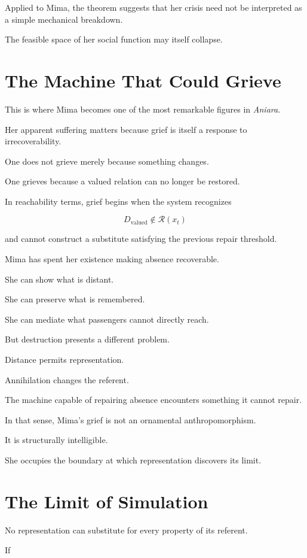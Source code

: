 \documentclass[11pt,oneside]{book}
\theoremstyle{definition}
\theoremstyle{remark}
\newcommand{\R}{\mathcal{R}}
\begin{document}
Applied to Mima, the theorem suggests that her crisis need not be interpreted as a simple mechanical breakdown.

The feasible space of her social function may itself collapse.

\section{The Machine That Could Grieve}

This is where Mima becomes one of the most remarkable figures in \emph{Aniara}.

Her apparent suffering matters because grief is itself a response to irrecoverability.

One does not grieve merely because something changes.

One grieves because a valued relation can no longer be restored.

In reachability terms, grief begins when the system recognizes

\[
D_{\mathrm{valued}}
\notin
\R(x_t)
\]

and cannot construct a substitute satisfying the previous repair threshold.

Mima has spent her existence making absence recoverable.

She can show what is distant.

She can preserve what is remembered.

She can mediate what passengers cannot directly reach.

But destruction presents a different problem.

Distance permits representation.

Annihilation changes the referent.

The machine capable of repairing absence encounters something it cannot repair.

In that sense, Mima's grief is not an ornamental anthropomorphism.

It is structurally intelligible.

She occupies the boundary at which representation discovers its limit.

\section{The Limit of Simulation}

No representation can substitute for every property of its referent.

If
\end{document}
